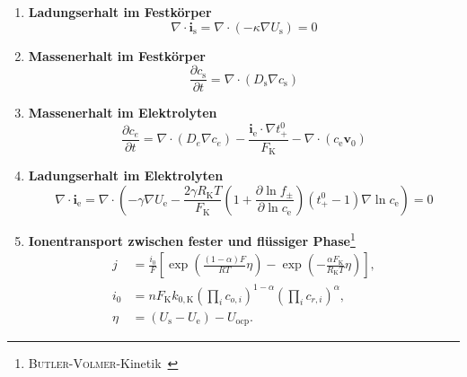 \begin{enumerate}
    \item \textbf{Ladungserhalt im Festkörper}
    \begin{equation}
        \label{eq:micro_potential_solid}
        \nabla \cdot \boldsymbol{i}_{\text{s}} = \nabla \cdot \left( - \kappa \nabla U_{\text{s}} \right) = 0
    \end{equation}

    \item \textbf{Massenerhalt im Festkörper}
    \begin{equation}
        \label{eq:micro_concentration_solid}
        \frac{\partial c_{\text{s}}}{\partial t} = \nabla \cdot \left( D_{\text{s}} \nabla c_{\text{s}} \right)
    \end{equation}

    \item \textbf{Massenerhalt im Elektrolyten}
    \begin{equation}
        \label{eq:micro_concentration_liquid}
        \frac{\partial c_e}{\partial t} = \nabla \cdot (D_e \nabla c_e) - \frac{\boldsymbol{i}_{\text{e}} \cdot \nabla t_+^0}{F_{\text{K}}} - \nabla \cdot (c_{\text{e}} \boldsymbol{v}_0)
    \end{equation}

    \item \textbf{Ladungserhalt im Elektrolyten}
    \begin{equation}
        \label{eq:micro_potential_electrolyte}
        \nabla \cdot \boldsymbol{i}_{\text{e}} = \nabla \cdot \left( - \gamma \nabla U_{\text{e}} - \frac{2\gamma R_{\text{K}} T}{F_{\text{K}}} \left(1 + \frac{\partial \ln f_\pm}{\partial \ln c_{\text{e}}}\right)(t_+^0 - 1)\nabla \ln c_{\text{e}} \right) = 0
    \end{equation}

    \item \textbf{Ionentransport zwischen fester und flüssiger Phase}\footnote{\textsc{Butler-Volmer}-Kinetik~\cite{Chen2022}}
    \begin{align}
        \label{eq:micro_butler_volmer}
        j &= \frac{i_0}{F}\left[\exp\left(\frac{(1-\alpha)F}{RT}\eta\right) - \exp\left(-\frac{\alpha F_{\text{K}}}{R_{\text{K}}T}\eta\right)\right],\\
        i_0 &= n F_{\text{K}} k_{0,\text{K}} \left(\prod_i c_{o,i}\right)^{1-\alpha} \left(\prod_i c_{r,i}\right)^\alpha,\\
        \eta &= (U_{\text{s}} - U_{\text{e}}) - U_{\text{ocp}}.
    \end{align}
\end{enumerate}

